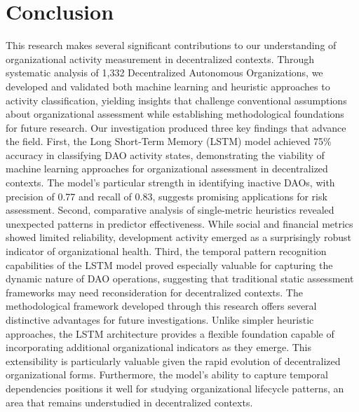 \chapter{Conclusion}
This research makes several significant contributions to our understanding of organizational activity measurement in decentralized contexts. Through systematic analysis of 1,332 Decentralized Autonomous Organizations, we developed and validated both machine learning and heuristic approaches to activity classification, yielding insights that challenge conventional assumptions about organizational assessment while establishing methodological foundations for future research.
Our investigation produced three key findings that advance the field. First, the Long Short-Term Memory (LSTM) model achieved 75\% accuracy in classifying DAO activity states, demonstrating the viability of machine learning approaches for organizational assessment in decentralized contexts. The model's particular strength in identifying inactive DAOs, with precision of 0.77 and recall of 0.83, suggests promising applications for risk assessment. Second, comparative analysis of single-metric heuristics revealed unexpected patterns in predictor effectiveness. While social and financial metrics showed limited reliability, development activity emerged as a surprisingly robust indicator of organizational health. Third, the temporal pattern recognition capabilities of the LSTM model proved especially valuable for capturing the dynamic nature of DAO operations, suggesting that traditional static assessment frameworks may need reconsideration for decentralized contexts.
The methodological framework developed through this research offers several distinctive advantages for future investigations. Unlike simpler heuristic approaches, the LSTM architecture provides a flexible foundation capable of incorporating additional organizational indicators as they emerge. This extensibility is particularly valuable given the rapid evolution of decentralized organizational forms. Furthermore, the model's ability to capture temporal dependencies positions it well for studying organizational lifecycle patterns, an area that remains understudied in decentralized contexts.

